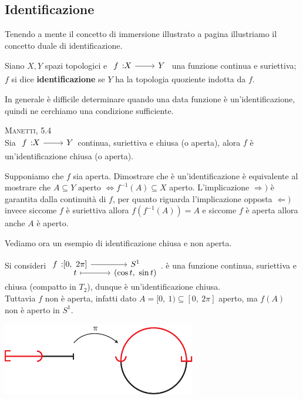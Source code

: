 	\subsection{Identificazione}
Tenendo a mente il concetto di immersione illustrato a pagina \pageref{immersione} illustriamo il concetto duale di identificazione.
\begin{define}
	Siano $X,Y$ spazi topologici e $\funz f X Y$ una funzione continua e suriettiva; $f$ si dice \textbf{identificazione} se $Y$ ha la topologia quoziente indotta da $f$.
\end{define}
In generale è difficile determinare quando una data funzione è un'identificazione, quindi ne cerchiamo una condizione sufficiente. 
\begin{theorema} \textsc{Manetti, 5.4}\\
	Sia $\funz f X Y$continua, suriettiva e chiusa (o aperta), alora $f$ è un'identificazione chiusa (o aperta).
\end{theorema}
\begin{demonstration}
	Supponiamo che $f$ sia aperta. Dimostrare che è un'identificazione è equivalente al mostrare che $\displaystyle A\subseteq Y \text{ aperto } \iff f^{-1}(A)\subseteq X$ aperto. L'implicazione $\Rightarrow)$ è garantita dalla continuità di $f$, per quanto riguarda l'implicazione opposta $\Leftarrow)$ invece siccome $f$ è suriettiva allora $f(f^{-1}(A))=A$ e siccome $f$ è aperta allora anche $A$ è aperto.
\end{demonstration}

Vediamo ora un esempio di identificazione chiusa e non aperta.
\begin{example}
	Si consideri $\displaystyle \funztot f {[0, \ 2\pi]} {S^1} t {(\cos t, \ \sin t)}$. è una funzione continua, suriettiva e chiusa (compatto in $T_2$), dunque è un'identificazione chiusa. \\
	Tuttavia $f$ non è aperta, infatti dato $A=[0, \ 1)\subseteq [0, \ 2\pi]$ aperto, ma $f(A)$ non è aperto in $S^1$.
		\begin{center}
			\includegraphics[width=240pt]{images/half_circle-eps-converted-to.pdf}
		\end{center}
\end{example}

